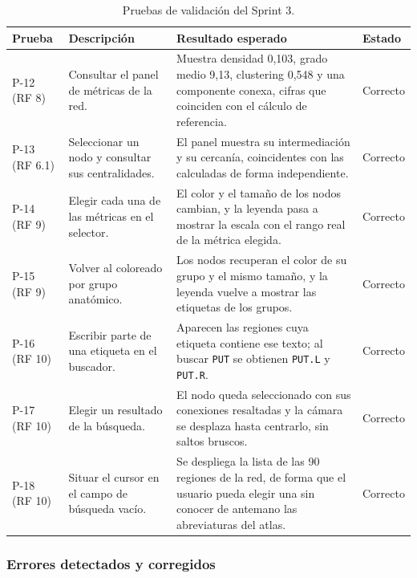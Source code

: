 \begin{table}[H]
	\centering
	\caption{Pruebas de validación del Sprint 3.}
	\label{tab:pruebas-s3}
	\small
	\begin{tabularx}{\textwidth}{>{\raggedright\arraybackslash}p{1.6cm} >{\raggedright\arraybackslash}X >{\raggedright\arraybackslash}X >{\centering\arraybackslash}p{1.6cm}}
		\toprule
		\textbf{Prueba} & \textbf{Descripción} & \textbf{Resultado esperado} & \textbf{Estado} \\
		\midrule
		P-12 (RF 8) & Consultar el panel de métricas de la red. &
			Muestra densidad 0,103, grado medio 9,13, clustering 0,548 y una componente conexa,
			cifras que coinciden con el cálculo de referencia. & Correcto \\
		\addlinespace
		P-13 (RF 6.1) & Seleccionar un nodo y consultar sus centralidades. &
			El panel muestra su intermediación y su cercanía, coincidentes con las calculadas de
			forma independiente. & Correcto \\
		\addlinespace
		P-14 (RF 9) & Elegir cada una de las métricas en el selector. &
			El color y el tamaño de los nodos cambian, y la leyenda pasa a mostrar la escala con el
			rango real de la métrica elegida. & Correcto \\
		\addlinespace
		P-15 (RF 9) & Volver al coloreado por grupo anatómico. &
			Los nodos recuperan el color de su grupo y el mismo tamaño, y la leyenda vuelve a
			mostrar las etiquetas de los grupos. & Correcto \\
		\addlinespace
		P-16 (RF 10) & Escribir parte de una etiqueta en el buscador. &
			Aparecen las regiones cuya etiqueta contiene ese texto; al buscar \texttt{PUT} se
			obtienen \texttt{PUT.L} y \texttt{PUT.R}. & Correcto \\
		\addlinespace
		P-17 (RF 10) & Elegir un resultado de la búsqueda. &
			El nodo queda seleccionado con sus conexiones resaltadas y la cámara se desplaza hasta
			centrarlo, sin saltos bruscos. & Correcto \\
		\addlinespace
		P-18 (RF 10) & Situar el cursor en el campo de búsqueda vacío. &
			Se despliega la lista de las 90 regiones de la red, de forma que el usuario pueda elegir
			una sin conocer de antemano las abreviaturas del atlas. & Correcto \\
		\bottomrule
	\end{tabularx}
\end{table}

\subsubsection*{Errores detectados y corregidos}

